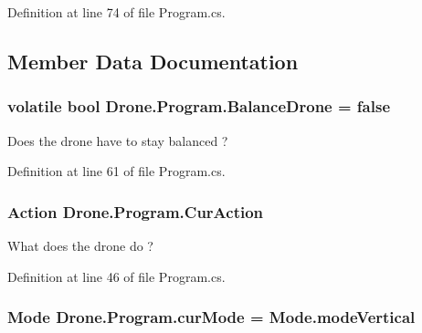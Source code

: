 Definition at line 74 of file Program.\+cs.



\subsection{Member Data Documentation}
\hypertarget{class_drone_1_1_program_a1a2665722afc1c24ed750a22ccf21d6a}{}
\subsubsection[{Balance\+Drone}]{\setlength{\rightskip}{0pt plus 5cm}volatile bool Drone.\+Program.\+Balance\+Drone = false\hspace{0.3cm}{\ttfamily [static]}}\label{class_drone_1_1_program_a1a2665722afc1c24ed750a22ccf21d6a}


Does the drone have to stay balanced ? 



Definition at line 61 of file Program.\+cs.

\hypertarget{class_drone_1_1_program_ad99d975310d2e7ec9ee9a7dc1b4f5877}{}
\subsubsection[{Cur\+Action}]{\setlength{\rightskip}{0pt plus 5cm}Action Drone.\+Program.\+Cur\+Action\hspace{0.3cm}{\ttfamily [static]}}\label{class_drone_1_1_program_ad99d975310d2e7ec9ee9a7dc1b4f5877}


What does the drone do ? 



Definition at line 46 of file Program.\+cs.

\hypertarget{class_drone_1_1_program_a68f4c050d6a63cb7b73b321a0c4d6939}{}
\subsubsection[{cur\+Mode}]{\setlength{\rightskip}{0pt plus 5cm}Mode Drone.\+Program.\+cur\+Mode = Mode.\+mode\+Vertical\hspace{0.3cm}{\ttfamily [static]}}\label{class_drone_1_1_program_a68f4c050d6a63cb7b73b321a0c4d6939}



